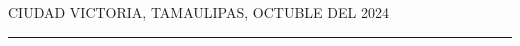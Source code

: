 \documentclass[12pt]{article}
\newcommand{\HRule}{\rule{\linewidth}{0.25mm}}
\newcommand{\fechaPortada}               {Octuble del 2024}
\newcommand{\iemph}[1]{\MakeTextUppercase{#1}}
\begin{document}
\begin{flushright}
\iemph{Ciudad Victoria, Tamaulipas, \fechaPortada}
\end{flushright}

\HRule 




\clearpage
{}
\setcounter{page}{1}

\clearpage


\clearpage


\clearpage


\clearpage


\clearpage


\clearpage




\clearpage

{} 
\printbibliography
 
\end{document}
